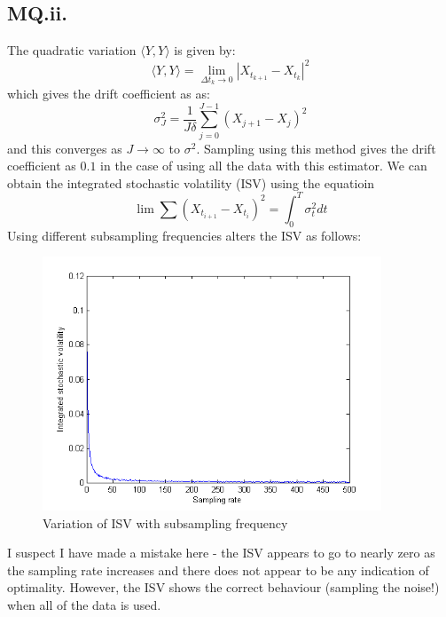 \documentclass[11pt]{article} %
\begin{document}
\subsection{MQ.ii.}
The quadratic variation $\langle Y,Y\rangle$ is given by:
\begin{equation}
	\langle Y,Y \rangle =\lim_{\Delta t_{k} \to 0}|X_{t_{k+1}} - X_{t_{k}}|^{2}
\end{equation}
which gives the drift coefficient as as:
\begin{equation}
	\sigma^{2}_{J} = \frac{1}{J\delta}\sum^{J-1}_{j=0}(X_{j+1}-X_{j})^{2}
\end{equation}
and this converges as $J\to\infty$ to $\sigma^{2}$. Sampling using this method gives the drift coefficient as $0.1$ in the case of using all the data with this estimator. We can obtain the integrated stochastic volatility (ISV) using the equatioin
\begin{equation}
	\lim\sum(X_{t_{i+1}} - X_{t_{i}})^{2} = \int^{T}_{0}\sigma^{2}_{t}dt
\end{equation}
Using different subsampling frequencies alters the ISV as follows:
\begin{figure}[h!]
\centering
\includegraphics[width = 0.9\textwidth]{MQqv.png}
\caption{Variation of ISV with subsampling frequency}
\end{figure}
I suspect I have made a mistake here - the ISV appears to go to nearly zero as the sampling rate increases and there does not appear to be any indication of optimality. However, the ISV shows the correct behaviour (sampling the noise!) when all of the data is used.
\end{document}
